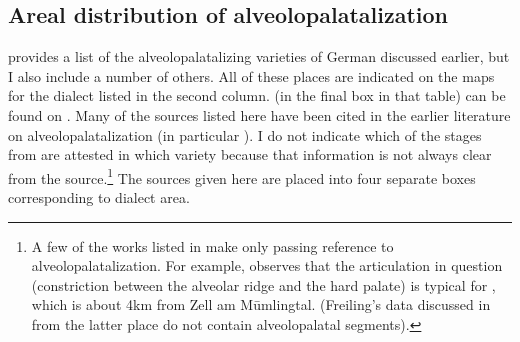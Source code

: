 \begin{xlist}
\section{Areal distribution of alveolopalatalization}\label{sec:10.5}\largerpage
{} provides a list of the alveolopalatalizing varieties of German discussed earlier, but I also include a number of others. All of these places are indicated on the maps for the dialect listed in the second column.  (in the final box in that table) can be found on . Many of the sources listed here have been cited in the earlier literature on alveolopalatalization (in particular \citealt{Herrgen1986}). I do not indicate which of the stages from  are attested in which variety because that information is not always clear from the source.\footnote{A few of the works listed in  make only passing reference to alveolopalatalization. For example, \citet[8]{Freiling1929} observes that the articulation in question (constriction between the alveolar ridge and the hard palate) is typical for , which is about 4km from Zell am Mūmlingtal. (Freiling’s data discussed in  from the latter place do not contain alveolopalatal segments).} The sources given here are placed into four separate boxes corresponding to dialect area.


\end{xlist}
